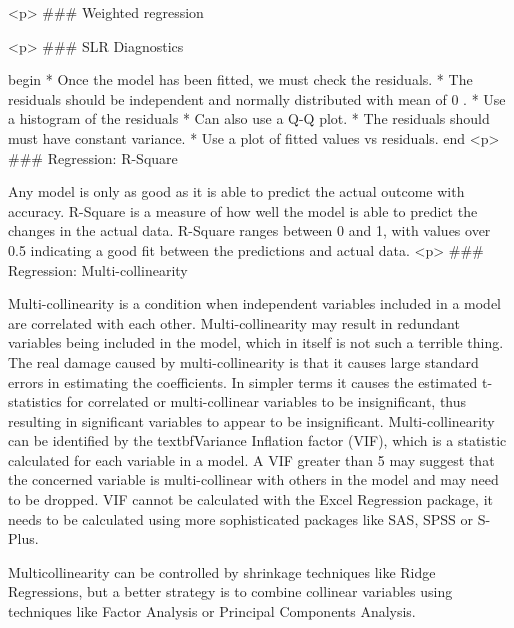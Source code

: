 <p>
### {Weighted regression}




<p>
### {SLR Diagnostics}

begin{ }
	 *           Once the model has been fitted, we must check the residuals.
	 *           The residuals should be independent and normally distributed with
	mean of 0 .
	 *           Use a histogram of the residuals
	 *           Can also use a Q-Q plot.
	 *           The residuals should must have constant variance.
	 *           Use a plot of fitted values vs residuals.
end{ }
<p>
### {Regression: R-Square}


Any model is only as good as it is able to predict the actual outcome with accuracy. R-Square is a measure of how well the model is able to predict the changes in the actual data. R-Square ranges between 0 and 1, with values over 0.5 indicating a good fit between the predictions and actual data.
<p>
### {Regression: Multi-collinearity}

Multi-collinearity is a condition when independent variables included in a model are correlated with each other. Multi-collinearity may result in redundant variables being included in the model, which in itself is not such a terrible thing. The real damage caused by multi-collinearity is that it causes large standard errors in estimating the coefficients. In simpler terms it causes the estimated t-statistics for correlated or multi-collinear variables to be insignificant, thus resulting in significant variables to appear to be insignificant. Multi-collinearity can be identified by the textbf{Variance Inflation factor (VIF)}, which is a statistic calculated for each variable in a model. A VIF greater than 5 may suggest that the concerned variable is multi-collinear with others in the model and may need to be dropped. VIF cannot be calculated with the Excel Regression package, it needs to be calculated using more sophisticated packages like SAS, SPSS or S-Plus.

Multicollinearity can be controlled by shrinkage techniques like Ridge Regressions, but a better strategy is to combine collinear variables using techniques like Factor Analysis or Principal Components Analysis.


